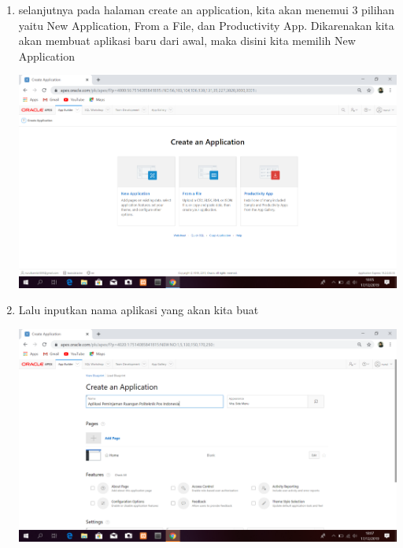 \documentclass{article}
\begin{document}
\begin{enumerate}
     \item  selanjutnya pada halaman create an application, kita akan menemui 3 pilihan yaitu New Application, From a File, dan Productivity App. Dikarenakan kita akan membuat aplikasi baru dari awal, maka disini kita memilih New Application
     \begin{center}
     \includegraphics[width=.8\textwidth]{Figure/2.PNG}
     \end{center}
     
     \item  Lalu inputkan nama aplikasi yang akan kita buat
     \begin{center}
     \includegraphics[width=.8\textwidth]{Figure/3.PNG}
     \end{center}
     

\end{enumerate}
\end{document}
